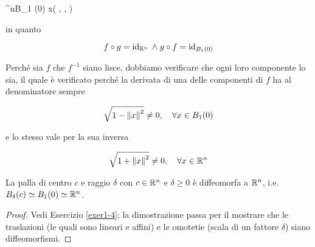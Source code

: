 	{\R^{n}}{B_{1} (0)}
	{x}{\left( , \cdots,  \right)}

in quanto

\begin{equation}
	f \circ g = \operatorname{id}_{\mathbb{R}^{n}} \; \wedge \; g \circ f = \operatorname{id}_{B_{1} (0)}
\end{equation}

Perché sia $ f $ che $ f^{-1} $ siano lisce, dobbiamo verificare che ogni loro componente lo sia, il quale è verificato perché la derivata di una delle componenti di $ f $ ha al denominatore sempre

\begin{equation}
	\sqrt{1 - \norm{x}^{2}} \neq 0 \qcomma \forall x \in B_{1} (0)
\end{equation}

e lo stesso vale per la sua inversa

\begin{equation}
	\sqrt{1 + \norm{x}^{2}} \neq 0 \qcomma \forall x \in \R^{n}
\end{equation}

\begin{corollary}
	La palla di centro $ c $ e raggio $ \delta $ con $ c \in \mathbb{R}^{n} $ e $ \delta \geqslant 0 $ è diffeomorfa a $ \mathbb{R}^{n} $, i.e. $ B_{\delta} (c) \simeq B_{1} (0) \simeq \mathbb{R}^{n} $.
\end{corollary}

\begin{proof}
	Vedi Esercizio \ref{exer1-4}; la dimostrazione passa per il mostrare che le traslazioni (le quali sono lineari e affini) e le omotetie (scala di un fattore $ \delta $) siano diffeomorfismi.
\end{proof}

